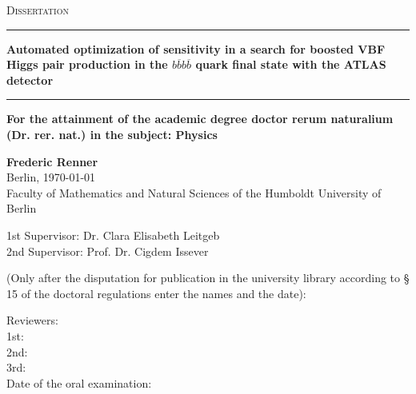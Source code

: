 
\begin{titlepage}
    \begin{center}
	{\scshape\Large Dissertation\\}
	\vspace{.1cm}
	\rule[1pt]{\textwidth}{1.5pt}
    \LARGE{\textbf{Automated optimization of sensitivity in a search for boosted VBF Higgs pair production in the $b\overline{b}b\overline{b}$ quark final state with the ATLAS detector
	}}
    \rule[11pt]{\textwidth}{1.5pt}
	
    {\normalsize\textbf{For the attainment of the academic degree doctor rerum naturalium (Dr. rer. nat.) in the subject: Physics}} 
    \vspace{1cm}

    \Large{\textbf{Frederic Renner\\}}
	Berlin, \today\\
    \vspace{1cm}
    \large
	Faculty of Mathematics and Natural Sciences of the Humboldt University of Berlin\\
    \vspace{1cm}

	1st Supervisor: Dr. Clara Elisabeth Leitgeb\\
	2nd Supervisor: Prof. Dr. Cigdem Issever
	\vspace{01cm}


	\newpage 
	(Only after the disputation for publication in the university library according to § 15	of the doctoral regulations enter the names and the date):\\
	\raggedright
	Reviewers: \\
	1st: \\
	2nd: \\
	3rd: \\
	
	Date of the oral examination: 
\end{center}
\end{titlepage}
